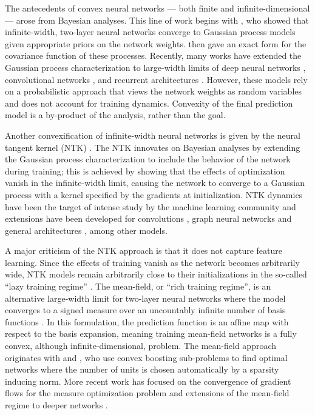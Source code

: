 
The antecedents of convex neural networks --- both finite and
infinite-dimensional --- arose from Bayesian analyses.
This line of work begins with \citet{neal1996priors}, who showed that
infinite-width, two-layer neural networks converge to
Gaussian process models given appropriate priors on the network weights.
\citet{williams1996computing} then gave an exact form for the covariance
function of these processes.
Recently, many works have extended the Gaussian process characterization to
large-width limits of deep neural networks
\citep{lee2019deep, matthews2018deep}, convolutional networks
\citep{novak2019convolutional, alonso2019convolutional}, and recurrent
architectures \citep{yang2019recurrent}.
However, these models rely on a probabilistic approach that views the network
weights as random variables and does not account for training dynamics.
Convexity of the final prediction model is a by-product of the analysis, rather
than the goal.

Another convexification of infinite-width neural networks is given by
the neural tangent kernel (NTK) \citep{jacot2018ntk}.
The NTK innovates on Bayesian analyses by extending the Gaussian process
characterization to include the behavior of the network during training;
this is achieved by showing that the effects of optimization vanish in the
infinite-width limit, causing the network to converge to a Gaussian process
with a kernel specified by the gradients at initialization.
NTK dynamics have been the target of intense study by the machine learning
community and extensions have been developed for convolutions
\citep{arora2019ntk}, graph neural networks \citep{du2019graph} and general
architectures \citep{yang2020tensor}, among other models.

A major criticism of the NTK approach is that it does not capture feature
learning.
Since the effects of training vanish as the network becomes arbitrarily wide,
NTK models remain arbitrarily close to their initializations in the so-called
``lazy training regime'' \citep{chizat2019lazy}.
The mean-field, or ``rich training regime'', is an alternative large-width
limit for two-layer neural networks where the model converges to a signed
measure over an uncountably infinite number of basis functions
\citep{bach2017breaking, mei2018mean}.
In this formulation, the prediction function is an affine map with respect to
the basis expansion, meaning training mean-field networks is a fully convex,
although infinite-dimensional, problem.
The mean-field approach originates with \citet{bengio2006convex} and
\citet{rosset2007regularization}, who use convex boosting sub-problems to find
optimal networks where the number of units is chosen automatically by a
sparsity inducing norm.
More recent work has focused on the convergence of gradient flows for the
measure optimization problem \citep{chizat2018convergence} and extensions
of the mean-field regime to deeper networks
\citep{yang2020tensor, sirignano2022mean, chizat2024speed}.

